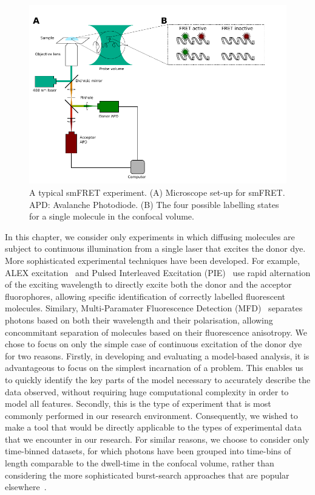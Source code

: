 \begin{figure}[b]
   \begin{center}
      \includegraphics*[width=5in]{inference/S1_diagram_scheme.pdf}
      \caption{A typical smFRET experiment. (A) Microscope set-up for smFRET. APD: Avalanche Photodiode. (B) The four possible labelling states for a single molecule in the confocal volume.}
      \label{fig:schematic}
   \end{center}
\end{figure}

In this chapter, we consider only experiments in which diffusing molecules are subject to continuous illumination from a single laser that excites the donor dye. More sophisticated experimental techniques have been developed. For example, ALEX excitation~\cite{kapanidis05, lee07} and Pulsed Interleaved Excitation (PIE)~\cite{muller05, kudryavtsev2012} use rapid alternation of the exciting wavelength to directly excite both the donor and the acceptor fluorophores, allowing specific identification of correctly labelled fluorescent molecules. Similary, Multi-Paramater Fluorescence Detection (MFD)~\cite{sisamakis2010, rothwell2002} separates photons based on both their wavelength and their polarisation, allowing concommitant separation of molecules based on their fluorescence anisotropy. We chose to focus on only the simple case of continuous excitation of the donor dye for two reasons. Firstly, in developing and evaluating a model-based analysis, it is advantageous to focus on the simplest incarnation of a problem. This enables us to quickly identify the key parts of the model necessary to accurately describe the data observed, without requiring huge computational complexity in order to model all features. Secondly, this is the type of experiment that is most commonly performed in our research environment. Consequently, we wished to make a tool that would be directly applicable to the types of experimental data that we encounter in our research. For similar reasons, we choose to consider only time-binned datasets, for which photons have been grouped into time-bins of length comparable to the dwell-time in the confocal volume, rather than considering the more sophisticated burst-search approaches that are popular elsewhere~\cite{nir06}. 

